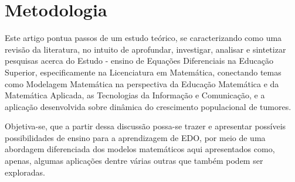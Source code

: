\section{Metodologia}

Este artigo pontua passos de um estudo teórico, se caracterizando como uma revisão da literatura, no intuito de aprofundar, investigar, 
analisar e sintetizar pesquisas acerca do Estudo - ensino de Equações Diferenciais na Educação Superior, especificamente na Licenciatura em Matemática,
conectando  temas como Modelagem Matemática na perspectiva da Educação Matemática e da Matemática Aplicada, as Tecnologias da Informação e Comunicação, 
e a aplicação desenvolvida sobre dinâmica do crescimento populacional de tumores.

Objetiva-se, que a partir dessa discussão possa-se trazer e apresentar possíveis possibilidades de ensino para a aprendizagem de EDO, por meio de 
uma abordagem diferenciada dos modelos matemáticos aqui apresentados como, apenas, algumas aplicações dentre várias outras que também podem ser exploradas.
